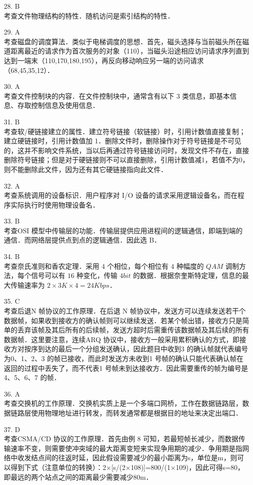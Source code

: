 28. B \\
考查文件物理结构的特性．随机访问是索引结构的特性．

29. A \\
考查磁盘的调度算法．类似于电梯调度的思想．首先，磁头选择与当前磁头所在磁道距离最近的请求作为首次服务的对象（110），当磁头沿途相应访问请求序列直到达到一端末（110,170,180,195），再反向移动响应另一端的访问请求（68,45,35,12）．

30. A \\
考查文件控制块的内容．在文件控制块中，通常含有以下 3 类信息，即基本信息、存取控制信息及使用信息．

31. B \\
考查软/硬链接建立的属性．建立符号链接（软链接）时，引用计数值直接复制；建立硬链接时，引用计数值加 1．删除文件时，删除操作对于符号链接是不可见的，这并不影响文件系统，当以后再通过符号链接访问时，发现文件不存在，直接删除符号链接；但是对于硬链接则不可以直接删除，引用计数值减1，若值不为0，则不能删除此文件，因为还有其它硬链接指向此文件．

32. A \\
考查系统调用的设备标识．用户程序对 I/O 设备的请求采用逻辑设备名，而在程序实际执行时使用物理设备名．

33. B \\
考查OSI 模型中传输层的功能．传输层提供应用进程间的逻辑通信，即端到端的通信．而网络层提供点到点的逻辑通信．因此选 B．

34. B \\
考查奈氏准则和香农定理．采用 $4$ 个相位，每个相位有 $4$ 种幅度的 $QAM$ 调制方法，每个信号可以有 $16$ 种变化，传输 $4bit$ 的数据．根据奈奎斯特定理，信息的最大传输速率为 $2\times3K\times4=24Kbps$．

35. C \\
考查后退N 帧协议的工作原理．在后退 N 帧协议中，发送方可以连续发送若干个数据帧，如果收到接收方的确认帧则可以继续发送．若某个帧出错，接收方只是简单的丢弃该帧及其后所有的后续帧，发送方超时后需重传该数据帧及其后续的所有数据帧．这里要注意，连续ARQ 协议中，接收方一般采用累积确认的方式，即接收方对按序到达的最后一个分组发送确认，因此题目中收到3 的确认帧就代表编号为0、1、2、3 的帧已接收，而此时发送方未收到1 号帧的确认只能代表确认帧在返回的过程中丢失了，而不代表1 号帧未到达接收方．因此需要重传的帧为编号是4、5、6、7 的帧．

36. A \\
考查交换机的工作原理．交换机实质上是一个多端口网桥，工作在数据链路层，数据链路层使用物理地址进行转发，而转发通常都是根据目的地址来决定出端口．

37. D \\
考查CSMA/CD 协议的工作原理．首先由例 8 可知，若最短帧长减少，而数据传输速率不变，则需要使冲突域的最大距离变短来实现争用期的减少．争用期是指网络中收发结点间的往返时延，因此假设需要减少的最小距离为s，单位是m，则可以得到下式（注意单位的转换）：2×[s/(2×108)]=800/(1×109)，因此可得s=80，即最远的两个站点之间的距离最少需要减少80m．

